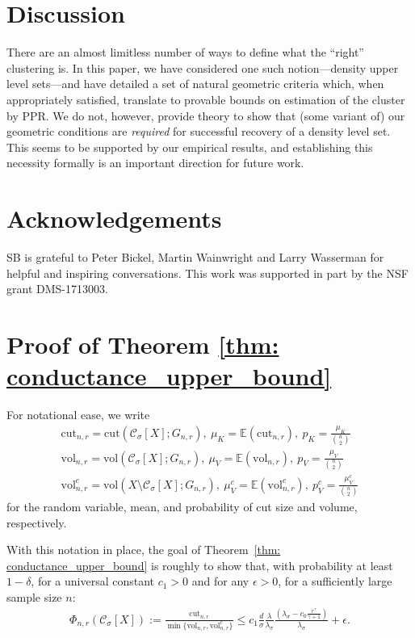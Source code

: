 \documentclass[11pt,twoside]{article}
\newcommand{\vol}{\mathrm{vol}}
\newcommand{\cut}{\mathrm{cut}}
\newcommand{\1}{\mathbf{1}}
\newcommand{\Xbf}{X}             %
\newcommand{\Cset}{\mathcal{C}}
\newcommand{\Csig}{\Cset_{\sigma}}
\begin{document}
\section{Discussion}
\label{sec: discussion}

There are an almost limitless number of ways to define what the ``right''
clustering is. In this paper, we have considered one such notion---density upper
level sets---and have detailed a set of natural geometric criteria which, when 
appropriately satisfied, translate to provable bounds on estimation of the
cluster by PPR. We do not, however, provide theory to show that (some variant of) 
our geometric
conditions are \emph{required} for successful recovery of a density level set. This
seems to be supported by our empirical results, and establishing this necessity
formally is an important direction for 
future work.  

\section{Acknowledgements}
SB is grateful to Peter Bickel, Martin Wainwright and Larry Wasserman for helpful and inspiring conversations. This work was supported in part by the NSF grant DMS-1713003.

\appendix

\section{Proof of Theorem \ref{thm: conductance_upper_bound}}
\label{sec: proof_of_theorem_1}

For notational ease, we write
\begin{align*}
\cut_{n,r} = \cut(\Csig[\Xbf]; G_{n,r}), ~ \mu_K = \mathbb{E}(\cut_{n,r}), ~ p_K = \frac{\mu_K}{{n \choose 2}} \\
\vol_{n,r} = \vol(\Csig[\Xbf]; G_{n,r}), ~ \mu_V = \mathbb{E}(\vol_{n,r}), ~ p_V = \frac{\mu_V}{{n \choose 2}} \\
\vol_{n,r}^c = \vol(\Xbf \setminus \Csig[\Xbf]; G_{n,r}), ~ \mu_V^c = \mathbb{E}(\vol_{n,r}^c), ~ p_V^c = \frac{\mu_V^c}{{n \choose 2}}
\end{align*}
for the random variable, mean, and probability of cut size and volume, respectively.

With this notation in place, the goal of Theorem~\ref{thm: conductance_upper_bound} is roughly to show that, with probability at least $1 - \delta$, for a universal constant $c_1 > 0$ and for any $\epsilon > 0$, for a sufficiently large sample size $n$:
\begin{align*}
\Phi_{n,r}(\Csig[\Xbf]) := \frac{\cut_{n,r}}{\min\{\vol_{n,r}, \vol_{n,r}^c\}} \leq c_1 \frac{d}{\sigma}
    \frac{\lambda}{\lambda_{\sigma}} \frac{(\lambda_{\sigma} -
      c_0\frac{r^{\gamma}}{\gamma+1})}{\lambda_{\sigma}} + \epsilon.
\end{align*}
\end{document}
